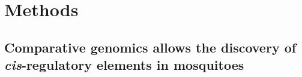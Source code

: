 
\appendix

\printglossaries

\chapter{Methods}

\section{Comparative genomics allows the discovery of \textit{cis}-regulatory elements in mosquitoes}

